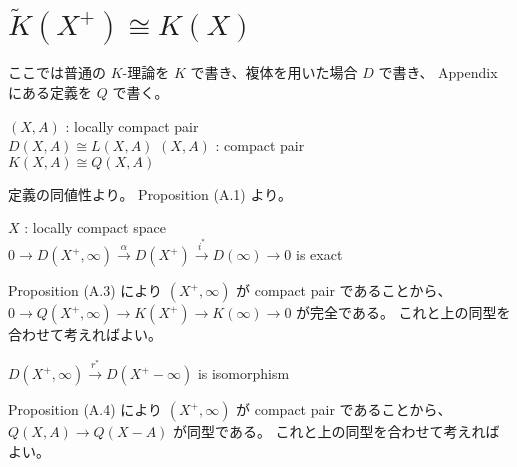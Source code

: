 \documentclass[dvipdfmx]{jsarticle}
\begin{document}
\section*{\(\tilde{K}(X^+) \cong K(X)\)}
ここでは普通の \(K\)-理論を \(K\) で書き、複体を用いた場合 \(D\) で書き、 Appendix にある定義を \(Q\) で書く。

\begin{Theorem}
\itemprop
  \For \((X,A)\) : locally compact pair \\
  \Then \(D(X,A) \cong L(X,A)\)
\itemprop
  \For \((X,A)\) : compact pair \\
  \Then \(K(X,A) \cong Q(X,A)\) 
\end{Theorem}

\begin{Proof}
\itemprof
  定義の同値性より。
\itemprof
  Proposition (A.1) より。
\end{Proof}

\begin{Theorem}
\itemprop
  \For \(X\) : locally compact space \\
  \Then \(0 \to D(X^+, \infty) \overset{\alpha}{\to} D(X^+) \overset{i^*}{\to} D(\infty) \to 0\) is exact
\end{Theorem}

\begin{Proof}
\itemprof
  Proposition (A.3) により \((X^+ , \infty)\) が compact pair であることから、 \(0 \to Q(X^+ , \infty) \to K(X^+) \to K(\infty) \to 0\) が完全である。
  これと上の同型を合わせて考えればよい。
\end{Proof}

\begin{Theorem}
\itemprop
  \(D(X^+, \infty) \overset{r^*}{\to} D(X^+ - \infty)\) is isomorphism
\end{Theorem}

\begin{Proof}
\itemprof
  Proposition (A.4) により \((X^+ , \infty)\) が compact pair であることから、 \(Q(X,A) \to Q(X-A)\) が同型である。
  これと上の同型を合わせて考えればよい。
\end{Proof}
\end{document}
